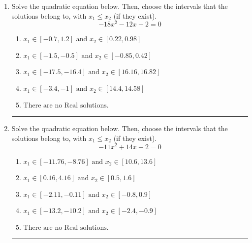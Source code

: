 \documentclass[14pt]{extbook}
\newcommand{\litem}[1]{\item#1\hspace*{-1cm}\rule{\textwidth}{0.4pt}}
\begin{document}
\begin{enumerate}
{\begin{enumerate}[label=\Alph*.]
\end{enumerate} }
\litem{
Solve the quadratic equation below. Then, choose the intervals that the solutions belong to, with $x_1 \leq x_2$ (if they exist).\[ -18x^{2} -12 x + 2 = 0 \]\begin{enumerate}[label=\Alph*.]
\item \( x_1 \in [-0.7, 1.2] \text{ and } x_2 \in [0.22, 0.98] \)
\item \( x_1 \in [-1.5, -0.5] \text{ and } x_2 \in [-0.85, 0.42] \)
\item \( x_1 \in [-17.5, -16.4] \text{ and } x_2 \in [16.16, 16.82] \)
\item \( x_1 \in [-3.4, -1] \text{ and } x_2 \in [14.4, 14.58] \)
\item \( \text{There are no Real solutions.} \)

\end{enumerate} }
\litem{
Solve the quadratic equation below. Then, choose the intervals that the solutions belong to, with $x_1 \leq x_2$ (if they exist).\[ -11x^{2} +14 x -2 = 0 \]\begin{enumerate}[label=\Alph*.]
\item \( x_1 \in [-11.76, -8.76] \text{ and } x_2 \in [10.6, 13.6] \)
\item \( x_1 \in [0.16, 4.16] \text{ and } x_2 \in [0.5, 1.6] \)
\item \( x_1 \in [-2.11, -0.11] \text{ and } x_2 \in [-0.8, 0.9] \)
\item \( x_1 \in [-13.2, -10.2] \text{ and } x_2 \in [-2.4, -0.9] \)
\item \( \text{There are no Real solutions.} \)


\end{enumerate}}
\end{enumerate}
\end{document}
